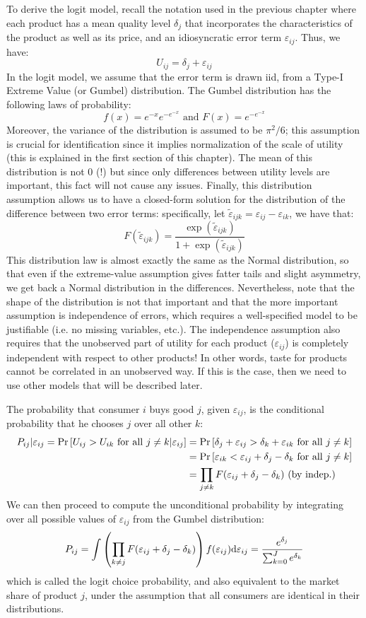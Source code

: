 To derive the logit model, recall the notation used in the previous chapter where each product has a mean quality level $\delta_j$ that incorporates the characteristics of the product as well as its price, and an idiosyncratic error term $\varepsilon_{ij}$. Thus, we have: $$ U_{ij} = \delta_j + \varepsilon_{ij} $$ In the logit model, we assume that the error term is drawn iid, from a Type-I Extreme Value (or Gumbel) distribution. The Gumbel distribution has the following laws of probability: $$ f(x) = e^{-x}e^{-e^{-x}} \text{ and } F(x) = e^{-e^{-x}} $$ Moreover, the variance of the distribution is assumed to be $\pi^2/6$; this assumption is crucial for identification since it implies normalization of the scale of utility (this is explained in the first section of this chapter). The mean of this distribution is not 0 (!) but since only differences between utility levels are important, this fact will not cause any issues. Finally, this distribution assumption allows us to have a closed-form solution for the distribution of the difference between two error terms: specifically, let $\tilde \varepsilon_{ijk} = \varepsilon_{ij} - \varepsilon_{ik}$, we have that: $$ F(\tilde \varepsilon_{ijk}) = \frac{\exp(\tilde \varepsilon_{ijk})}{1 + \exp(\tilde \varepsilon_{ijk})} $$ This distribution law is almost exactly the same as the Normal distribution, so that even if the extreme-value assumption gives fatter tails and slight asymmetry, we get back a Normal distribution in the differences. Nevertheless, note that the shape of the distribution is not that important and that the more important assumption is independence of errors, which requires a well-specified model to be justifiable (i.e. no missing variables, etc.). The independence assumption also requires that the unobserved part of utility for each product ($\varepsilon_{ij}$) is completely independent with respect to other products! In other words, taste for products cannot be correlated in an unobserved way. If this is the case, then we need to use other models that will be described later.

The probability that consumer $i$ buys good $j$, given $\varepsilon_{ij}$, is the conditional probability that he chooses $j$ over all other $k$: \begin{align*} P_{ij}|\varepsilon_{ij} = \operatorname{Pr}\left[U_{ij}>U_{ik}\text{ for all } j\neq k | \varepsilon_{ij} \right] & = \operatorname{Pr}\left[\delta_j + \varepsilon_{ij} >\delta_k + \varepsilon_{ik}\text{ for all } j\neq k\right] \\
& = \operatorname{Pr}\left[ \varepsilon_{ik} < \varepsilon_{ij} + \delta_j - \delta_k \text{ for all } j\neq k \right] \\
& = \prod_{j\neq k} F(\varepsilon_{ij} + \delta_j - \delta_k) \text{ (by indep.)}
\end{align*}
We can then proceed to compute the unconditional probability by integrating over all possible values of $\varepsilon_{ij}$ from the Gumbel distribution: $$ P_{ij} = \int \left(\prod_{k\neq j} F(\varepsilon_{ij} + \delta_j - \delta_k)\right) f(\varepsilon_{ij})\mathrm{d}\varepsilon_{ij} = \frac{ e^{\delta_{j}} }{ \sum_{k=0}^{J} e^{\delta_{k}} } $$ which is called the logit choice probability, and also equivalent to the market share of product $j$, under the assumption that all consumers are identical in their distributions.

